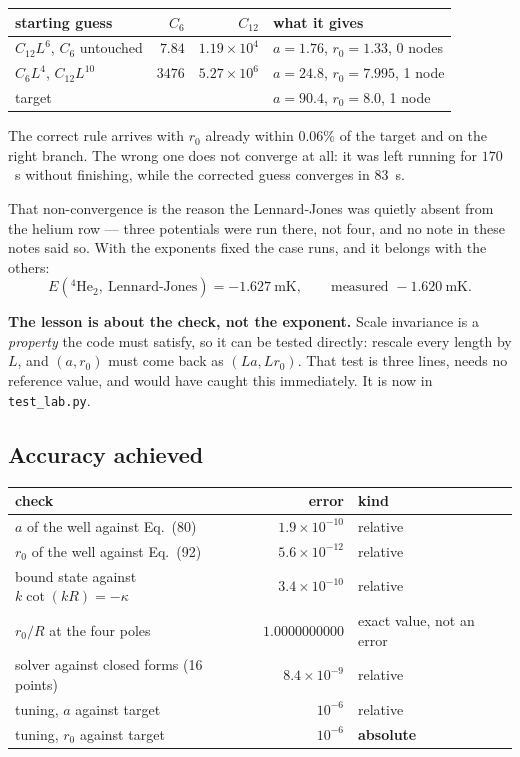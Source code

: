 \documentclass[11pt,a4paper]{article}
\begin{document}
\begin{center}
\begin{tabular}{lrrl}
\toprule
starting guess & $C_6$ & $C_{12}$ & what it gives \\
\midrule
$C_{12}L^6$, $C_6$ untouched & $7.84$ & $1.19\times10^{4}$ & $a=1.76$, $r_0=1.33$, 0 nodes \\
$C_6L^4$, $C_{12}L^{10}$ & $3476$ & $5.27\times10^{6}$ & $a=24.8$, $r_0=7.995$, 1 node \\
\midrule
target & & & $a=90.4$, $r_0=8.0$, 1 node \\
\bottomrule
\end{tabular}
\end{center}

The correct rule arrives with $r_0$ already within $0.06\%$ of the target and on
the right branch. The wrong one does not converge at all: it was left running
for $170$~s without finishing, while the corrected guess converges in $83$~s.

That non-convergence is the reason the Lennard-Jones was quietly absent from the
helium row --- three potentials were run there, not four, and no note in these
notes said so. With the exponents fixed the case runs, and it belongs with the
others:
\[
  E(^4\mathrm{He}_2,\ \mathrm{Lennard\text{-}Jones}) = -1.627\ \mathrm{mK},
  \qquad \text{measured } -1.620\ \mathrm{mK}.
\]

\textbf{The lesson is about the check, not the exponent.} Scale invariance is a
\emph{property} the code must satisfy, so it can be tested directly: rescale
every length by $L$, and $(a, r_0)$ must come back as $(La, Lr_0)$. That test is
three lines, needs no reference value, and would have caught this immediately.
It is now in \texttt{test\_lab.py}.

\subsection{Accuracy achieved}

\begin{center}
\begin{tabular}{lrl}
\toprule
check & error & kind \\
\midrule
$a$ of the well against Eq.~(80) & $1.9\times10^{-10}$ & relative \\
$r_0$ of the well against Eq.~(92) & $5.6\times10^{-12}$ & relative \\
bound state against $k\cot(kR)=-\kappa$ & $3.4\times10^{-10}$ & relative \\
$r_0/R$ at the four poles & $1.0000000000$ & exact value, not an error \\
solver against closed forms (16 points) & $8.4\times10^{-9}$ & relative \\
tuning, $a$ against target & $10^{-6}$ & relative \\
tuning, $r_0$ against target & $10^{-6}$ & \textbf{absolute} \\
\bottomrule
\end{tabular}
\end{center}
\end{document}
